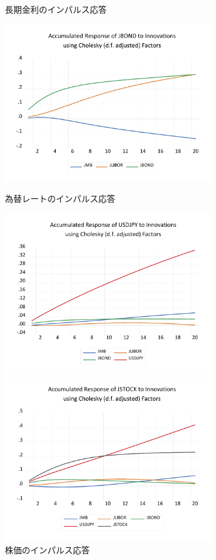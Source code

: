 \documentclass[12pt]{jarticle}
\begin{document}
{\newpage
\begin{figure}[!htbp]
  \begin{minipage}{0.5\hsize}
    \caption{長期金利のインパルス応答}
    \begin{center}
      \includegraphics[width=9cm]{ijbond.pdf}
    \end{center}
  \end{minipage}
  \begin{minipage}{0.5\hsize}
    \caption{為替レートのインパルス応答}
    \begin{center}
      \includegraphics[width=9cm]{ijrate.pdf}
    \end{center}
  \end{minipage}
  \begin{minipage}{0.5\hsize}
    \caption{株価のインパルス応答}
    \begin{center}
      \includegraphics[width=9cm]{ijstock.pdf}

\end{center}
\end{minipage}
\end{figure}}
\end{document}
